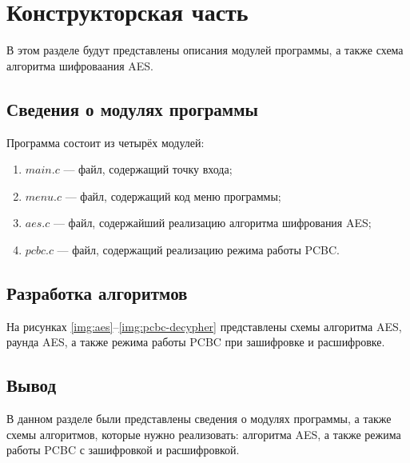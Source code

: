 \chapter{Конструкторская часть}
В этом разделе будут представлены описания модулей программы, а также схема алгоритма шифроваания AES.

\section{Сведения о модулях программы}
Программа состоит из четырёх модулей:
\begin{enumerate}[label=\arabic*)]
	\item $main.c$ --- файл, содержащий точку входа;
    \item $menu.c$ --- файл, содержащий код меню программы;
    \item $aes.c$ --- файл, содержайший реализацию алгоритма шифрования AES;
    \item $pcbc.c$ --- файл, содержащий реализацию режима работы PCBC.
\end{enumerate}

\section{Разработка алгоритмов}
На рисунках \ref{img:aes}--\ref{img:pcbc-decypher} представлены схемы алгоритма AES, раунда AES, а также режима работы PCBC при зашифровке и расшифровке.
\clearpage

\clearpage
{}

\section*{Вывод}

В данном разделе были представлены сведения о модулях программы, а также схемы алгоритмов, которые нужно реализовать: алгоритма AES, а также режима работы PCBC с зашифровкой и расшифровкой.
